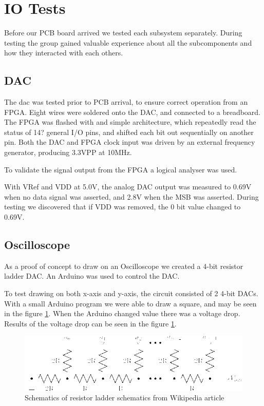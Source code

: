 \section{IO Tests}
Before our PCB board arrived we tested each subsystem separately.
During testing the group gained valuable experience about all the subcomponents and how they interacted with each others.

\subsection{DAC}
The dac was tested prior to PCB arrival, to ensure correct operation from an FPGA.
Eight wires were soldered onto the DAC, and connected to a breadboard.
The FPGA was flashed with and simple architecture, which repeatedly read the status of 14? general I/O pins, and shifted each bit out sequentially on another pin.
Both the DAC and FPGA clock input was driven by an external frequency generator, producing 3.3VPP at 10MHz.

To validate the signal output from the FPGA a logical analyser was used.

With VRef and VDD at 5.0V, the analog DAC output was measured to 0.69V when no data signal was asserted, and 2.8V when the MSB was asserted.
During testing we discovered that if VDD was removed, the 0 bit value changed to 0.69V.

\subsection{Oscilloscope}
As a proof of concept to draw on an Oscilloscope we created a 4-bit resistor ladder DAC.
An Arduino was used to control the DAC.

To test drawing on both x-axis and y-axis, the circuit consisted of 2 4-bit DACs.
With a small Arduino program we were able to draw a square, and may be seen in the figure \ref{fig:r2r-ladder}.
When the Arduino changed value there was a voltage drop.
Results of the voltage drop can be seen in the figure \ref{fig:r2r-ladder}.


\begin{figure}[h]
\includegraphics[width=\columnwidth]{images/r2r-ladder}
\centering
\caption{Schematics of resistor ladder schematics from Wikipedia article \cite{r2r-ladder-schematics}}
\label{fig:r2r-ladder}
\end{figure}
